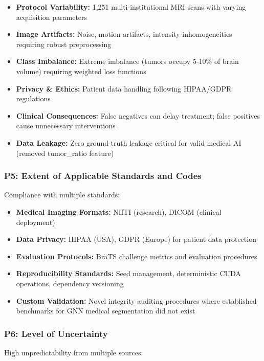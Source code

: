 \begin{itemize}
    \item \textbf{Protocol Variability:} 1,251 multi-institutional MRI scans with varying acquisition parameters
    \item \textbf{Image Artifacts:} Noise, motion artifacts, intensity inhomogeneities requiring robust preprocessing
    \item \textbf{Class Imbalance:} Extreme imbalance (tumors occupy 5-10\% of brain volume) requiring weighted loss functions
    \item \textbf{Privacy \& Ethics:} Patient data handling following HIPAA/GDPR regulations
    \item \textbf{Clinical Consequences:} False negatives can delay treatment; false positives cause unnecessary interventions
    \item \textbf{Data Leakage:} Zero ground-truth leakage critical for valid medical AI (removed tumor\_ratio feature)
\end{itemize}

\subsubsection*{P5: Extent of Applicable Standards and Codes}

Compliance with multiple standards:

\begin{itemize}
    \item \textbf{Medical Imaging Formats:} NIfTI (research), DICOM (clinical deployment)
    \item \textbf{Data Privacy:} HIPAA (USA), GDPR (Europe) for patient data protection
    \item \textbf{Evaluation Protocols:} BraTS challenge metrics and evaluation procedures
    \item \textbf{Reproducibility Standards:} Seed management, deterministic CUDA operations, dependency versioning
    \item \textbf{Custom Validation:} Novel integrity auditing procedures where established benchmarks for GNN medical segmentation did not exist
\end{itemize}

\subsubsection*{P6: Level of Uncertainty}

High unpredictability from multiple sources:

